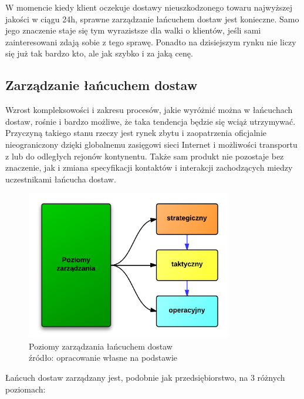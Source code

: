 		W momencie kiedy klient oczekuje dostawy nieuszkodzonego 
		towaru najwyższej jakości w ciągu 24h, sprawne zarządzanie 
		łańcuchem dostaw jest konieczne. Samo jego znaczenie staje
		się tym wyrazistsze dla walki o klientów, jeśli sami zainteresowani
		zdają sobie z tego sprawę. Ponadto na dzisiejszym rynku nie liczy się
		już tak bardzo kto, ale jak szybko i za jaką cenę.
		
	\subsection{Zarządzanie łańcuchem dostaw}
		Wzrost kompleksowości i zakresu procesów, jakie wyróżnić można
		w łańcuchach dostaw, rośnie i bardzo możliwe, że taka tendencja będzie
		się wciąż utrzymywać. Przyczyną takiego stanu rzeczy jest rynek zbytu
		i zaopatrzenia oficjalnie nieograniczony dzięki globalnemu zasięgowi
		sieci Internet i możliwości transportu z lub do odległych rejonów kontynentu.
		Także sam produkt nie pozostaje bez znaczenie, jak i zmiana specyfikacji kontaktów
		i interakcji zachodzących miedzy uczestnikami łańcucha dostaw.
		\begin{figure}[H]
			\centering
			\includegraphics[width=0.8\textwidth]{images/3LevelsScm}
			\caption[Poziomy zarządzania łańcuchem dostaw]{
				Poziomy zarządzania łańcuchem dostaw\\
				źródło: opracowanie własne na podstawie \cite{ewolucja_lancuchow_dostaw_cz1}
			}
			\label{fig:3_levels_of_supply_chain}
		\end{figure}
		Łańcuch dostaw zarządzany jest, podobnie jak przedsiębiorstwo, na 3 różnych poziomach:
